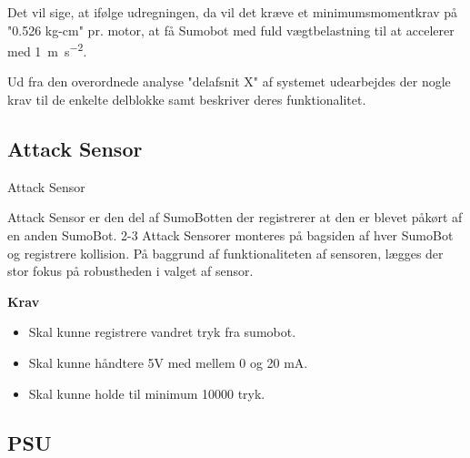 Det vil sige, at ifølge udregningen, da vil det kræve et minimumsmomentkrav på "0.526 kg-cm" pr. motor, at få Sumobot med fuld vægtbelastning til at accelerer med \SI{1}{\meter\per\second\squared}. 

Ud fra den overordnede analyse "delafsnit X" af systemet udearbejdes der nogle krav til de enkelte delblokke samt beskriver deres
funktionalitet.



\subsection{Attack Sensor}

\begin{PartBlokDescription}{Attack Sensor}{}

\BlokSpacer{0cm}
\end{PartBlokDescription}

Attack Sensor er den del af SumoBotten der registrerer at den er blevet påkørt af en anden SumoBot.
2-3 Attack Sensorer monteres på bagsiden af hver SumoBot og registrere kollision.
På baggrund af funktionaliteten af sensoren, lægges der stor fokus på robustheden i valget af sensor. 

\textbf{Krav}
\begin{itemize}
\item Skal kunne registrere vandret tryk fra sumobot.
\item Skal kunne håndtere 5V med mellem 0 og 20 mA.
\item Skal kunne holde til minimum 10000 tryk.
\end{itemize}


\subsection{PSU}

